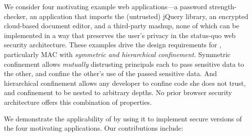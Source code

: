 We consider four motivating example web ap\-pli\-ca\-tions---a
password strength-checker, an application that imports the (untrusted)
jQuery library, an encrypted cloud-based document editor, and a
third-party mashup, none of which can be implemented in a way that
preserves the user's privacy in the status-quo web security
architecture. These examples drive the design requirements for \sys{},
particularly MAC with {\em symmetric and hierarchical confinement.}
Symmetric confinement allows {\em mutually} distrusting principals
each to pass sensitive data to the other, and confine the other's use
of the passed sensitive data. And hierarchical confinement allows any
developer to confine code she does not trust, and confinement to be
nested to arbitrary depths.
%
No prior browser security architecture offers this combination of
properties.


We demonstrate the applicability of \sys{} by using it to implement
secure versions of the four motivating applications.
Our contributions include:

